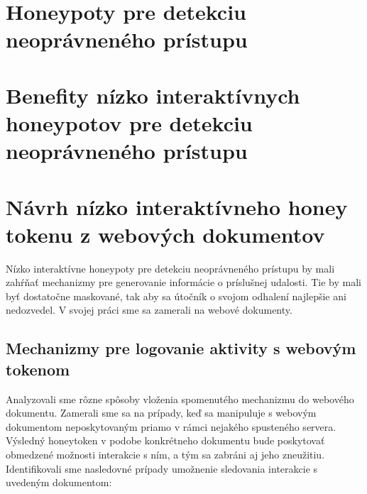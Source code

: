 \documentclass[conference, 11pt,slovak,a4paper,twoside]{IEEEtran}
\begin{document}
\section{Honeypoty pre detekciu neoprávneného prístupu}

\section{Benefity nízko interaktívnych honeypotov pre detekciu neoprávneného prístupu}


\section{Návrh nízko interaktívneho honey tokenu z webových dokumentov}

Nízko interaktívne honeypoty pre detekciu neoprávneného prístupu by mali zahŕňať mechanizmy pre generovanie informácie o príslušnej udalosti. Tie by mali byť dostatočne maskované, tak aby sa útočník o svojom odhalení najlepšie ani nedozvedel. V svojej práci sme sa zamerali na webové dokumenty. 


\subsection{Mechanizmy pre logovanie aktivity s webovým tokenom}

Analyzovali sme rôzne spôsoby vloženia spomenutého mechanizmu do webového dokumentu. Zamerali sme sa na prípady, keď sa manipuluje s webovým dokumentom neposkytovaným priamo v rámci nejakého spusteného servera. Výsledný honeytoken v podobe konkrétneho dokumentu bude poskytovať obmedzené možnosti interakcie s ním, a tým sa zabráni aj jeho zneužitiu. Identifikovali sme nasledovné prípady umožnenie sledovania interakcie s uvedeným dokumentom:
\end{document}
